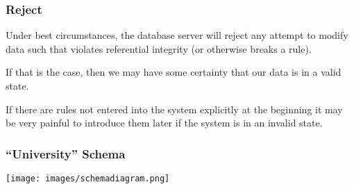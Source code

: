 \begin{frame}
\frametitle{Reject}

Under best circumstances, the database server will reject any attempt to modify data such that violates referential integrity (or otherwise breaks a rule). 

If that is the case, then we may have some certainty that our data is in a valid state. 

If there are rules not entered into the system explicitly at the beginning it may be very painful to introduce them later if the system is in an invalid state. 


\end{frame}



\begin{frame}
\frametitle{``University'' Schema}

\begin{center}
	\texttt{[image: images/schemadiagram.png]}
\end{center}


\end{frame}






